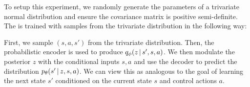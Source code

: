 
To setup this experiment, we randomly generate the parameters of a trivariate normal distribution and ensure the covariance matrix is positive semi-definite. The \cvae{} is trained with samples from the trivariate distribution in the following way:

First, we sample $(s, a, s')$ from the trivariate distribution. Then, the probabilistic encoder is used to produce $\qphi \given{z}{s', s, a}$. We then modulate the posterior $z$ with the conditional inputs $s, a$ and use the decoder to predict the distribution $\ptheta \given{s'}{z, s, a}$. We can view this as analogous to the goal of learning the next state $s'$ conditioned on the current state $s$ and control actions $a$.


